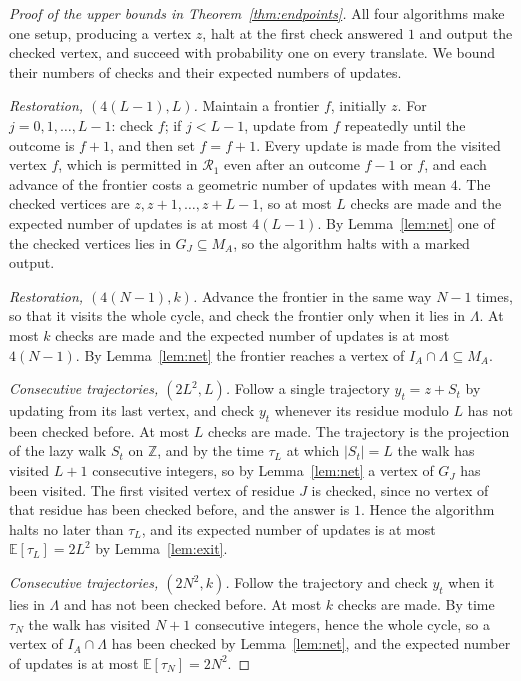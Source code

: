 \documentclass{amsart}
\theoremstyle{plain}
\theoremstyle{definition}
\theoremstyle{remark}
\newcommand{\Z}{\mathbb{Z}}
\newcommand{\E}{\mathbb{E}}
\newcommand{\res}{\mathcal{R}}
\begin{document}
\begin{proof}[Proof of the upper bounds in Theorem~\ref{thm:endpoints}]
All four algorithms make one setup, producing a vertex $z$, halt at the first check answered $1$ and output the checked vertex, and succeed with probability one on every translate. We bound their numbers of checks and their expected numbers of updates.

\emph{Restoration, $(4(L-1),L)$.} Maintain a frontier $f$, initially $z$. For $j=0,1,\dots,L-1$: check $f$; if $j<L-1$, update from $f$ repeatedly until the outcome is $f+1$, and then set $f=f+1$. Every update is made from the visited vertex $f$, which is permitted in $\res_1$ even after an outcome $f-1$ or $f$, and each advance of the frontier costs a geometric number of updates with mean $4$. The checked vertices are $z,z+1,\dots,z+L-1$, so at most $L$ checks are made and the expected number of updates is at most $4(L-1)$. By Lemma~\ref{lem:net} one of the checked vertices lies in $G_J\subseteq M_A$, so the algorithm halts with a marked output.

\emph{Restoration, $(4(N-1),k)$.} Advance the frontier in the same way $N-1$ times, so that it visits the whole cycle, and check the frontier only when it lies in $\Lambda$. At most $k$ checks are made and the expected number of updates is at most $4(N-1)$. By Lemma~\ref{lem:net} the frontier reaches a vertex of $I_A\cap\Lambda\subseteq M_A$.

\emph{Consecutive trajectories, $(2L^2,L)$.} Follow a single trajectory $y_t=z+S_t$ by updating from its last vertex, and check $y_t$ whenever its residue modulo $L$ has not been checked before. At most $L$ checks are made. The trajectory is the projection of the lazy walk $S_t$ on $\Z$, and by the time $\tau_L$ at which $|S_t|=L$ the walk has visited $L+1$ consecutive integers, so by Lemma~\ref{lem:net} a vertex of $G_J$ has been visited. The first visited vertex of residue $J$ is checked, since no vertex of that residue has been checked before, and the answer is $1$. Hence the algorithm halts no later than $\tau_L$, and its expected number of updates is at most $\E[\tau_L]=2L^2$ by Lemma~\ref{lem:exit}.

\emph{Consecutive trajectories, $(2N^2,k)$.} Follow the trajectory and check $y_t$ when it lies in $\Lambda$ and has not been checked before. At most $k$ checks are made. By time $\tau_N$ the walk has visited $N+1$ consecutive integers, hence the whole cycle, so a vertex of $I_A\cap\Lambda$ has been checked by Lemma~\ref{lem:net}, and the expected number of updates is at most $\E[\tau_N]=2N^2$.
\end{proof}
\end{document}
